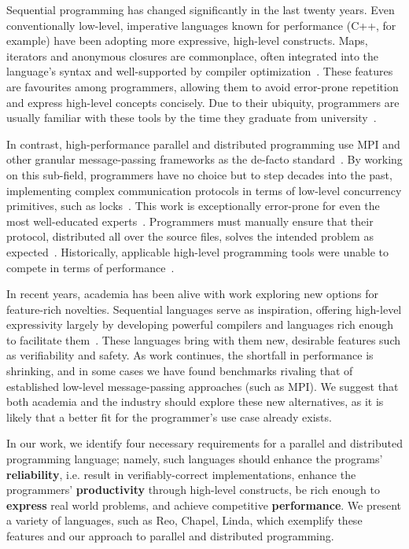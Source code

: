Sequential programming has changed significantly in the last twenty years. Even conventionally low-level, imperative languages known for performance (C++, for example) have been adopting more expressive, high-level constructs. Maps, iterators and anonymous closures are commonplace, often integrated into the language's syntax and well-supported by compiler optimization~\cite{cppAdvanced}. These features are favourites among programmers, allowing them to avoid error-prone repetition and express high-level concepts concisely. Due to their ubiquity, programmers are usually familiar with these tools by the time they graduate from university~\cite{chapel}.

In contrast, high-performance parallel and distributed programming use MPI and other granular message-passing frameworks as the de-facto standard~\cite{MPI}. By working on this sub-field, programmers have no choice but to step decades into the past, implementing complex communication protocols in terms of low-level concurrency primitives, such as locks~\cite{chapel}. This work is exceptionally error-prone for even the most well-educated experts~\cite{proper}. Programmers must manually ensure that their protocol, distributed all over the source files, solves the intended problem as expected~\cite{proper}. Historically, applicable high-level programming tools were unable to compete in terms of performance~\cite{rustSystem}.

In recent years, academia has been alive with work exploring new options for feature-rich novelties. Sequential languages serve as inspiration, offering high-level expressivity largely by developing powerful compilers and languages rich enough to facilitate them~\cite{impala}. These languages bring with them new, desirable features such as verifiability and safety. As work continues, the shortfall in performance is shrinking, and in some cases we have found benchmarks rivaling that of established low-level message-passing approaches (such as MPI). We suggest that both academia and the industry should explore these new alternatives, as it is likely that a better fit for the programmer's use case already exists.

In our work, we identify four necessary requirements for a parallel and distributed programming language; namely, such languages should enhance the programs' \textbf{reliability}, i.e. result in verifiably-correct implementations, enhance the programmers' \textbf{productivity} through high-level constructs, be rich enough to \textbf{express} real world problems, and achieve competitive \textbf{performance}. We present a variety of languages, such as Reo,  Chapel, Linda, which exemplify these features and our approach to parallel and distributed programming.

